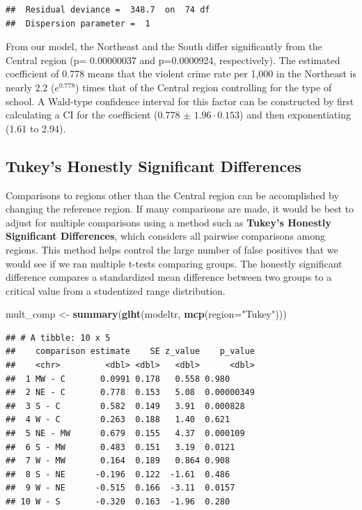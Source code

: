 \documentclass[
]{krantz}
\newenvironment{Shaded}{\begin{snugshade}}{\end{snugshade}}
\newcommand{\DataTypeTok}[1]{\textcolor[rgb]{0.27,0.27,0.27}{#1}}
\newcommand{\KeywordTok}[1]{\textcolor[rgb]{0.27,0.27,0.27}{\textbf{#1}}}
\newcommand{\NormalTok}[1]{#1}
\newcommand{\StringTok}[1]{\textcolor[rgb]{0.5,0.5,0.5}{#1}}
\begin{document}
\begin{verbatim}
##  Residual deviance =  348.7  on  74 df 
##  Dispersion parameter =  1
\end{verbatim}

From our model, the Northeast and the South differ significantly from the Central region (p= 0.00000037 and p=0.0000924, respectively). The estimated coefficient of 0.778 means that the violent crime rate per 1,000 in the Northeast is nearly 2.2 (\(e^{0.778}\)) times that of the Central region controlling for the type of school. A Wald-type confidence interval for this factor can be constructed by first calculating a CI for the coefficient (0.778 \(\pm\) \(1.96 \cdot 0.153\)) and then exponentiating (1.61 to 2.94).

\hypertarget{tukeys-honestly-significant-differences}{%
\subsection{Tukey's Honestly Significant Differences}\label{tukeys-honestly-significant-differences}}

Comparisons to regions other than the Central region can be accomplished by changing the reference region. If many comparisons are made, it would be best to adjust for multiple comparisons using a method such as \textbf{Tukey's Honestly Significant Differences},  which considers all pairwise comparisons among regions. This method helps control the large number of false positives that we would see if we ran multiple t-tests comparing groups. The honestly significant difference compares a standardized mean difference between two groups to a critical value from a studentized range distribution.

\begin{Shaded}
\begin{Highlighting}[]
\NormalTok{mult_comp <-}\StringTok{ }\KeywordTok{summary}\NormalTok{(}\KeywordTok{glht}\NormalTok{(modeltr, }\KeywordTok{mcp}\NormalTok{(}\DataTypeTok{region=}\StringTok{"Tukey"}\NormalTok{)))}
\end{Highlighting}
\end{Shaded}

\begin{verbatim}
## # A tibble: 10 x 5
##    comparison estimate    SE z_value    p_value
##    <chr>         <dbl> <dbl>   <dbl>      <dbl>
##  1 MW - C       0.0991 0.178   0.558 0.980     
##  2 NE - C       0.778  0.153   5.08  0.00000349
##  3 S - C        0.582  0.149   3.91  0.000828  
##  4 W - C        0.263  0.188   1.40  0.621     
##  5 NE - MW      0.679  0.155   4.37  0.000109  
##  6 S - MW       0.483  0.151   3.19  0.0121    
##  7 W - MW       0.164  0.189   0.864 0.908     
##  8 S - NE      -0.196  0.122  -1.61  0.486     
##  9 W - NE      -0.515  0.166  -3.11  0.0157    
## 10 W - S       -0.320  0.163  -1.96  0.280
\end{verbatim}
\end{document}
